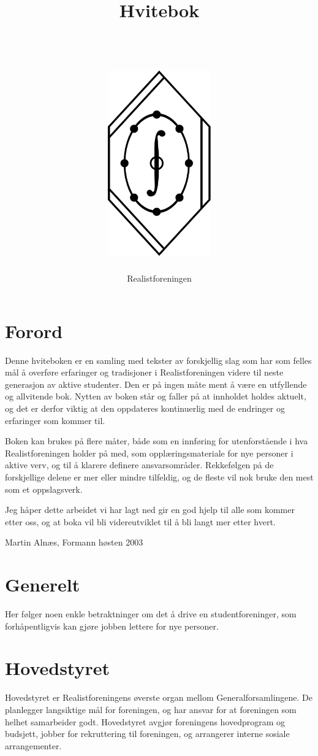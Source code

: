\documentclass[11pt,norsk,a4paper,pointlessnumbers]{scrbook}
\title{Hvitebok\\
       \quad \\
       \quad \\
       \includegraphics[height=8cm]{rflogo} }
\author{Realistforeningen}
\begin{document}
\frontmatter

\maketitle{}
\tableofcontents{}


\chapter{Forord}
Denne hviteboken er en samling med tekster av forskjellig slag som har
som felles mål å overføre erfaringer og tradisjoner i Realistforeningen
videre til neste generasjon av aktive studenter. Den er på ingen måte
ment å være en utfyllende og allvitende bok. Nytten av boken står og
faller på at innholdet holdes aktuelt, og det er derfor viktig at den
oppdateres kontinuerlig med de endringer og erfaringer som kommer til.

Boken kan brukes på flere måter, både som en innføring for utenforstående
i hva Realistforeningen holder på med, som opplæringsmateriale for nye
personer i aktive verv, og til å klarere definere ansvarsområder.
Rekkefølgen på de forskjellige delene er mer eller mindre tilfeldig,
og de fleste vil nok bruke den mest som et oppslagsverk.

Jeg håper dette arbeidet vi har lagt ned gir en god hjelp til alle
som kommer etter oss, og at boka vil bli videreutviklet til å bli
langt mer etter hvert.

Martin Alnæs, Formann høsten 2003


\mainmatter

\chapter{Generelt}
Her følger noen enkle betraktninger om det å drive en studentforeninger,
som forhåpentligvis kan gjøre jobben lettere for nye personer.


\chapter{Hovedstyret}
Hovedstyret er Realistforeningens øverste organ mellom Generalforsamlingene.
De planlegger langsiktige mål for foreningen, og har ansvar for at
foreningen som helhet samarbeider godt. Hovedstyret avgjør foreningens
hovedprogram og budsjett, jobber for rekruttering til foreningen, og
arrangerer interne sosiale arrangementer.


\end{document}
